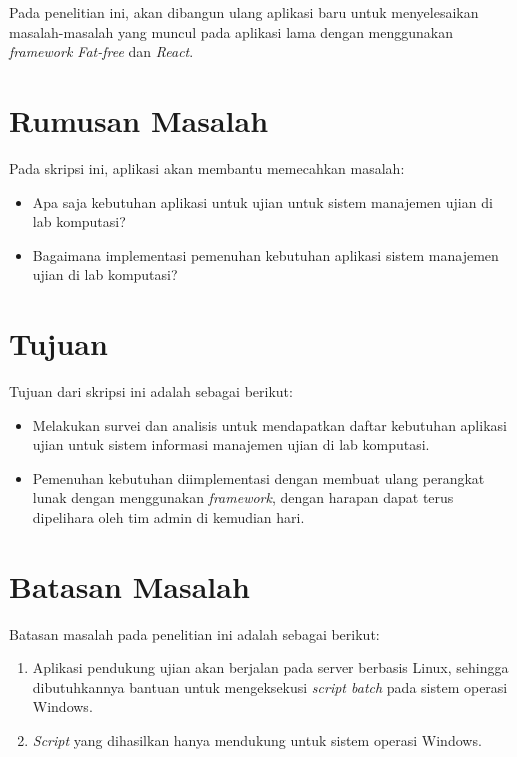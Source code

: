 Pada penelitian ini, akan dibangun ulang aplikasi baru untuk
menyelesaikan masalah-masalah yang muncul pada aplikasi lama dengan
menggunakan \textit{framework Fat-free} dan \textit{React}.

\section{Rumusan Masalah}
\label{sec:rumusan}
Pada skripsi ini, aplikasi akan membantu memecahkan masalah:
\begin{itemize}
    \item Apa saja kebutuhan aplikasi untuk ujian untuk sistem manajemen
    ujian di lab komputasi?
    
    \item Bagaimana implementasi pemenuhan kebutuhan aplikasi sistem
    manajemen ujian di lab komputasi?
\end{itemize}

\section{Tujuan}
\label{sec:tujuan}
Tujuan dari skripsi ini adalah sebagai berikut:
\begin{itemize}
    \item Melakukan survei dan analisis untuk mendapatkan daftar kebutuhan
        aplikasi ujian untuk sistem informasi manajemen ujian di lab
        komputasi.

    \item Pemenuhan kebutuhan diimplementasi dengan membuat ulang perangkat
        lunak dengan menggunakan \textit{framework}, dengan harapan dapat terus
        dipelihara oleh tim admin di kemudian hari.

\end{itemize}

\section{Batasan Masalah}
\label{sec:batasan}
Batasan masalah pada penelitian ini adalah sebagai berikut:
\begin{enumerate}
    \item Aplikasi pendukung ujian akan berjalan pada server berbasis Linux,
        sehingga dibutuhkannya bantuan untuk mengeksekusi \textit{script batch}
        pada sistem operasi Windows.
        
    \item \textit{Script} yang dihasilkan hanya mendukung untuk sistem operasi Windows.
\end{enumerate}


